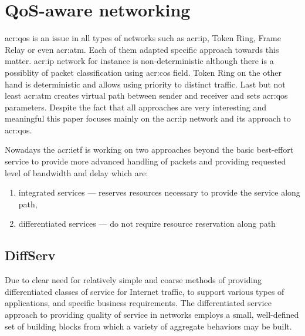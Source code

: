 \documentclass[11pt]{book}
\begin{document}
    \section{QoS-aware networking}
    \label{sec:ctx:qos}


      \gls{acr:qos} is an issue in all types of networks such as \gls{acr:ip}, Token Ring, Frame Relay or even
      \gls{acr:atm}.  Each of them adapted specific approach towards this matter. \gls{acr:ip} network for instance is
      non-deterministic although there is a possiblity of packet classification using \gls{acr:cos} field. Token Ring on
      the other hand is deterministic and allows using priority to distinct traffic. Last but not least \gls{acr:atm}
      creates virtual path between sender and receiver and sets \gls{acr:qos} parameters. Despite the fact that all
      approaches are very interesting and meaningful this paper focuses mainly on the \gls{acr:ip} network and its
      approach to \gls{acr:qos}.


      Nowadays the \gls{acr:ietf} is working on two approaches beyond the basic best-effort service to provide more
      advanced handling of packets and providing requested level of bandwidth and delay which are:

      \begin{enumerate}
        \item integrated services --- reserves resources necessary to provide the service along path,
        \item differentiated services --- do not require resource reservation along path
      \end{enumerate}


      \subsection{DiffServ}

        Due to clear need for relatively simple and coarse methods of providing differentiated classes of service for
        Internet traffic, to support various types of applications, and specific business requirements. The
        differentiated service approach to providing quality of service in networks employs a small, well-defined set of
        building blocks from which a variety of aggregate behaviors may be built. \cite{qos}
\end{document}
